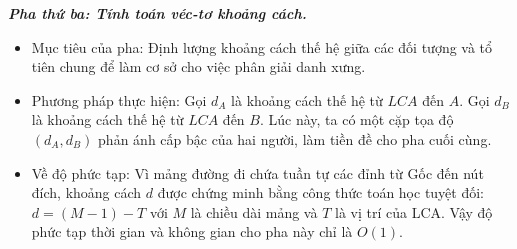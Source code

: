 

\textbf{\textit{Pha thứ ba: Tính toán véc-tơ khoảng cách.}}
\begin{itemize}
	\item Mục tiêu của pha: Định lượng khoảng cách thế hệ giữa các đối tượng và tổ tiên chung để làm cơ sở cho việc phân giải danh xưng.
	\item Phương pháp thực hiện: Gọi $d_A$ là khoảng cách thế hệ từ $LCA$ đến $A$. Gọi $d_B$ là khoảng cách thế hệ từ $LCA$ đến $B$. Lúc này, ta có một cặp tọa độ $(d_A, d_B)$ phản ánh cấp bậc của hai người, làm tiền đề cho pha cuối cùng.
	\item Về độ phức tạp: Vì mảng đường đi chứa tuần tự các đỉnh từ Gốc đến nút đích, khoảng cách $d$ được chứng minh bằng công thức toán học tuyệt đối: $d = (M - 1) - T$ với $M$ là chiều dài mảng và $T$ là vị trí của LCA. Vậy độ phức tạp thời gian và không gian cho pha này chỉ là $O(1)$.
\end{itemize}

